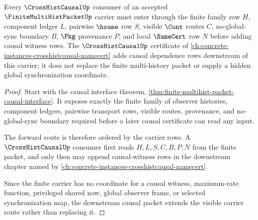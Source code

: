 \begin{theorem}
\label{thm:finite-multihist-packet-crosshist-forward-route}
Every $\CrossHistCausalUp$ consumer of an accepted $\FiniteMultiHistPacketUp$ carrier must enter through the finite family row $H$, component ledger $L$, pairwise $\hsame$ row $S$, visible $\Cont$ routes $C$, no-global-sync boundary $B$, $\Pkg$ provenance $P$, and local $\NameCert$ row $N$ before adding causal witness rows. The $\CrossHistCausalUp$ certificate of \autoref{ch:concrete-instances-crosshistcausal-namecert} adds causal dependence rows downstream of this carrier; it does not replace the finite multi-history packet or supply a hidden global synchronization coordinate.
\end{theorem}
\begin{proof}
Start with the causal interface theorem, \autoref{thm:finite-multihist-packet-causal-interface}. It exposes exactly the finite family of observer histories, component ledgers, pairwise transport rows, visible routes, provenance, and no-global-sync boundary required before a later causal certificate can read any input.

The forward route is therefore ordered by the carrier rows. A $\CrossHistCausalUp$ consumer first reads $H,L,S,C,B,P,N$ from the finite packet, and only then may append causal-witness rows in the downstream chapter named by \autoref{ch:concrete-instances-crosshistcausal-namecert}.

Since the finite carrier has no coordinate for a causal witness, maximum-rate function, privileged shared now, global observer frame, or selected synchronization map, the downstream causal packet extends the visible carrier route rather than replacing it.
\end{proof}


\begin{closurestatus}{\FiniteMultiHistPacketUp}
  \theoryclosure{\seedClosure}
  \formalstatus{\unformalizedV}
\end{closurestatus}

